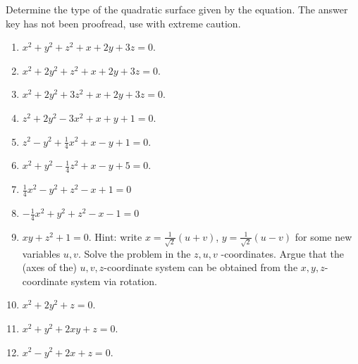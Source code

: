 Determine the type of the quadratic surface given by the equation. The answer key has not been proofread, use with extreme caution.
\begin{enumerate}
\item 
$x^2 +y^2+z^2+x+2y+3z=0$.
\item $x^2 +2y^2+z^2+x+2y+3z=0$.
\item $x^2 +2y^2+3z^2+x+2y+3z=0$.
\item \label{problemTypeOfSurfacez^2+2y^2-3x^2+x+y+1=0} $z^2+2y^2-3x^2 + x+y+1=0 $.
\item $z^2-y^2+\frac{1}{4}x^2 + x-y+1=0 $.
\item $x^2+y^2-\frac{1}{4}z^2 + x-y+5=0 $.
\item $\frac{1}{4}x^2-y^2+z^2-x+1=0$
\item $-\frac{1}{4}x^2+y^2+z^2-x-1=0$
\item $xy +z^2+1=0$. Hint: write $x=\frac{1}{\sqrt{2}}(u+v)$, $y=\frac{1}{ \sqrt{ 2} } (u-v) $ for some new variables $u,v$. Solve the problem in the $z,u,v$ -coordinates. Argue that the (axes of the) $u,v,z$-coordinate system can be obtained from the $x,y,z$-coordinate system via rotation.
\item $x^2+2y^2+z=0 $.
\item $x^2+y^2+2xy+z=0 $.
\item $x^2-y^2+2x+z=0 $.
\end{enumerate}